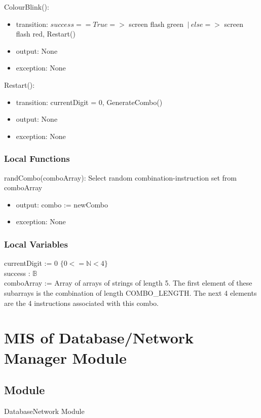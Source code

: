 \documentclass[12pt, titlepage]{article}
\begin{document}
\noindent ColourBlink():
\begin{itemize}
\item transition: $success == True =>$ screen flash green $\: | \: else =>$ screen flash red, Restart()
\item output: None
\item exception: None
\end{itemize}

\noindent Restart():
\begin{itemize}
\item transition: currentDigit = 0, GenerateCombo()
\item output: None
\item exception: None
\end{itemize}


\subsubsection{Local Functions}
randCombo(comboArray): Select random combination-instruction set from comboArray
\begin{itemize}
    \item output: combo := newCombo
    \item exception: None
\end{itemize}

\subsubsection{Local Variables}
currentDigit := 0 $\{0<=\mathbb{N}<4\}$\\
success : $\mathds{B}$\\
comboArray := Array of arrays of strings of length 5. The first element of these subarrays is the combination of length COMBO\_LENGTH. The next 4 elements are the 4 instructions associated with this combo.\\
\newpage

\section{MIS of Database/Network Manager Module} \label{sec:DatabaseNetworkModule} 

\subsection{Module}

DatabaseNetwork Module
\end{document}
